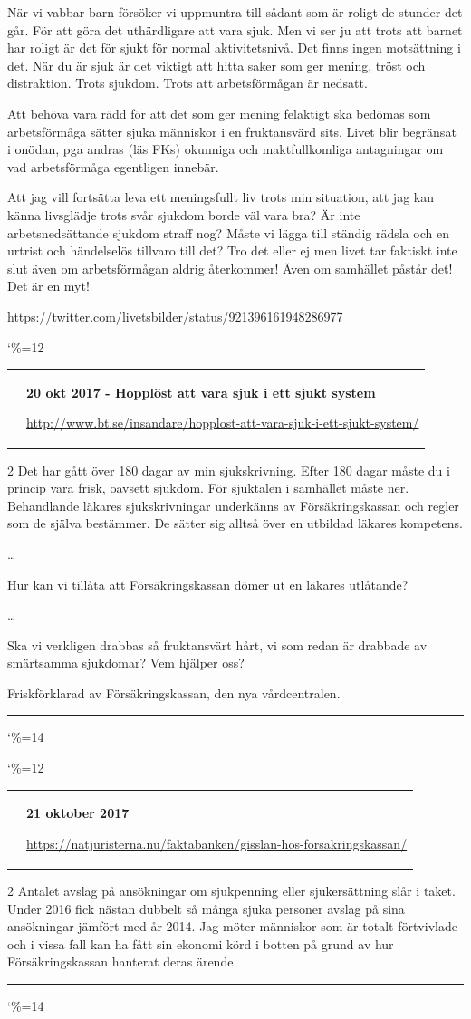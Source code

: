 \documentclass[a4paper]{article}
\makeatletter
\newcommand{\entry}{
\catcode`\%=12
\@entry}
\newcommand{\@entry}[3]{
\bigskip
\begin{tabular*}{\textwidth}{l m{\textwidth-4cm}}
\qrcode{#3} & \textbf{#1}

\medskip

\url{#3}

\end{tabular*}

\medskip


\begin{multicols}{2}
#2
\end{multicols}

\medskip
\hrule

\catcode`\%=14
}
\makeatother
\begin{document}
{{När vi vabbar barn försöker vi uppmuntra till sådant som är roligt de stunder det går. För att göra det uthärdligare att vara sjuk.
Men vi ser ju att trots att barnet har roligt är det för sjukt för normal aktivitetsnivå. Det finns ingen motsättning i det.
När du är sjuk är det viktigt att hitta saker som ger mening, tröst och distraktion. Trots sjukdom. Trots att arbetsförmågan är nedsatt.

Att behöva vara rädd för att det som ger mening felaktigt ska bedömas som arbetsförmåga sätter sjuka människor i en fruktansvärd sits.
Livet blir begränsat i onödan, pga andras (läs FKs) okunniga och maktfullkomliga antagningar om vad arbetsförmåga egentligen innebär.

Att jag vill fortsätta leva ett meningsfullt liv trots min situation, att jag kan känna livsglädje trots svår sjukdom borde väl vara bra?
Är inte arbetsnedsättande sjukdom straff nog? Måste vi lägga till ständig rädsla och en urtrist och händelselös tillvaro till det?
Tro det eller ej men livet tar faktiskt inte slut även om arbetsförmågan aldrig återkommer! Även om samhället påstår det! Det är en myt!}
{https://twitter.com/livetsbilder/status/921396161948286977}


\entry{20 okt 2017 - Hopplöst att vara sjuk i ett sjukt system}{Det har gått över 180 dagar av min sjukskrivning. Efter 180 dagar måste du i princip vara frisk, oavsett sjukdom. För sjuktalen i samhället måste ner. Behandlande läkares sjukskrivningar underkänns av Försäkringskassan och regler som de själva bestämmer. De sätter sig alltså över en utbildad läkares kompetens.

\ldots

Hur kan vi tillåta att Försäkringskassan dömer ut en läkares utlåtande?

\ldots

Ska vi verkligen drabbas så fruktansvärt hårt, vi som redan är drabbade av smärtsamma sjukdomar? Vem hjälper oss?

Friskförklarad av Försäkringskassan, den nya vårdcentralen.}{http://www.bt.se/insandare/hopplost-att-vara-sjuk-i-ett-sjukt-system/}






\entry{21 oktober 2017}{Antalet avslag på ansökningar om sjukpenning eller sjukersättning slår i taket. Under 2016 fick nästan dubbelt så många sjuka personer avslag på sina ansökningar jämfört med år 2014. Jag möter människor som är totalt förtvivlade och i vissa fall kan ha fått sin ekonomi körd i botten på grund av hur Försäkringskassan hanterat deras ärende.}{https://natjuristerna.nu/faktabanken/gisslan-hos-forsakringskassan/}



}
\end{document}
